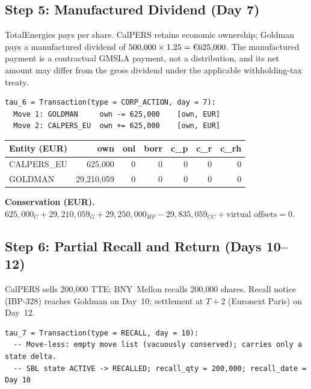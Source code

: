 \documentclass[11pt,a4paper]{article}
\newcommand{\EUR}[1]{\mbox{\texteuro#1}}
\begin{document}
\subsection{Step 5: Manufactured Dividend (Day 7)}
\label{sec:eu-step5}

TotalEnergies pays \EUR{1.25} per share. CalPERS retains economic ownership; Goldman pays a manufactured dividend of $500{,}000 \times 1.25 = \text{\EUR{625,000}}$. The manufactured payment is a contractual GMSLA payment, not a distribution, and its net amount may differ from the gross dividend under the applicable withholding-tax treaty.

\begin{lstlisting}
tau_6 = Transaction(type = CORP_ACTION, day = 7):
  Move 1: GOLDMAN     own -= 625,000    [own, EUR]
  Move 2: CALPERS_EU  own += 625,000    [own, EUR]
\end{lstlisting}

\begin{center}\small
\begin{tabular}{l r r r r r r}
\toprule
\textbf{Entity (EUR)} & own & onl & borr & c\_p & c\_r & c\_rh \\
\midrule
CALPERS\_EU & 625{,}000 & 0 & 0 & 0 & 0 & 0 \\
GOLDMAN & 29{,}210{,}059 & 0 & 0 & 0 & 0 & 0 \\
\bottomrule
\end{tabular}
\end{center}

\noindent\textbf{Conservation (EUR).} $625{,}000_C + 29{,}210{,}059_G + 29{,}250{,}000_{HF} - 29{,}835{,}059_{CC} + \text{virtual offsets} = 0$. \checkmark

\subsection{Step 6: Partial Recall and Return (Days 10--12)}
\label{sec:eu-step6}

CalPERS sells 200{,}000 TTE; BNY~Mellon recalls 200{,}000 shares. Recall notice (IBP-328) reaches Goldman on Day~10; settlement at $T+2$ (Euronext Paris) on Day~12.

\begin{lstlisting}
tau_7 = Transaction(type = RECALL, day = 10):
  -- Move-less: empty move list (vacuously conserved); carries only a state delta.
  -- SBL state ACTIVE -> RECALLED; recall_qty = 200,000; recall_date = Day 10
\end{lstlisting}
\end{document}
